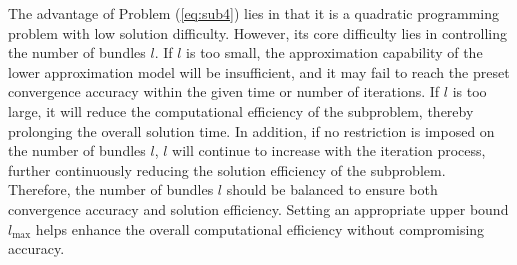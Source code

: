\documentclass{jcmlatex}
\begin{document}
The advantage of Problem (\ref{eq:sub4}) lies in that it is a quadratic programming problem with low solution difficulty. However, its core difficulty lies in controlling the number of bundles \( l \). If \( l \) is too small, the approximation capability of the lower approximation model will be insufficient, and it may fail to reach the preset convergence accuracy within the given time or number of iterations. If \( l \) is too large, it will reduce the computational efficiency of the subproblem, thereby prolonging the overall solution time. In addition, if no restriction is imposed on the number of bundles \( l \), \( l \) will continue to increase with the iteration process, further continuously reducing the solution efficiency of the subproblem. Therefore, the number of bundles \(l\) should be balanced to ensure both convergence accuracy and solution efficiency. Setting an appropriate upper bound \(l_{\max}\) helps enhance the overall computational efficiency without compromising accuracy.
\end{document}
